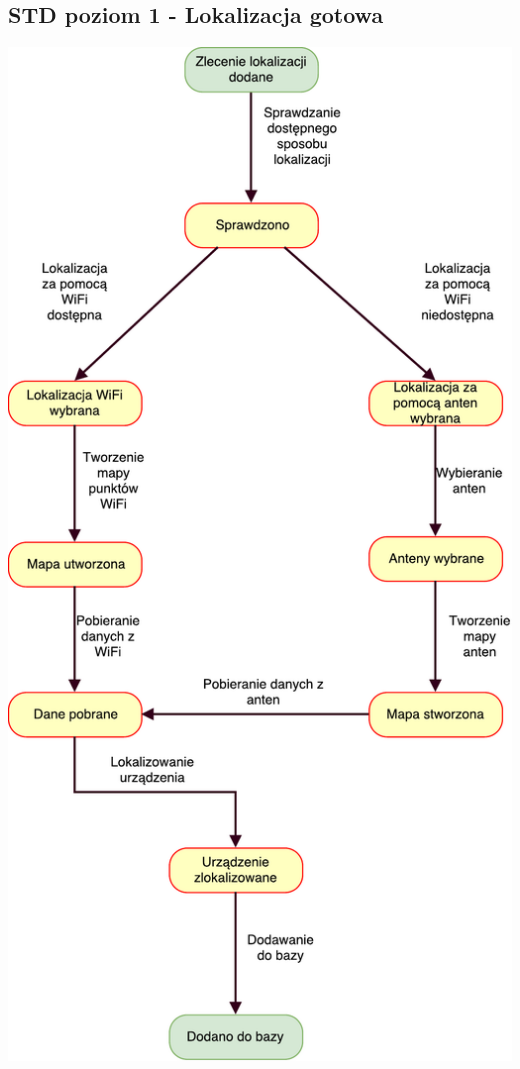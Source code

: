 \documentclass[11pt]{article}
\begin{document}
	\subsection{STD poziom 1 - Lokalizacja gotowa}
	\begin{center}
		\includegraphics[scale=0.9]{STD1.pdf}
	\end{center}
	\newpage
\end{document}
